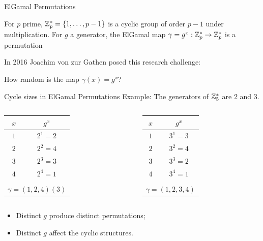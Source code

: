 \begin{frame}{ElGamal Permutations}

For $p$ prime, $\mathbb{Z}_p^* = \{1, \ldots, p-1\}$ is a cyclic group of order $p-1$ under multiplication. For $g$ a generator, the ElGamal map $\gamma = g^x: \mathbb{Z}_p^* \rightarrow \mathbb{Z}_p^*$ is a permutation
\vspace{1cm}

In 2016 Joachim von zur Gathen posed this research challenge:

\begin{center}
  {\Large
How random is the map $\gamma(x) = g^x$?}
\end{center}

\end{frame}




\begin{frame}{Cycle sizes in ElGamal Permutations}
Example: The generators of $\mathbb{Z}_5^*$ are  $2$ and $3$.

    \begin{columns}
        \begin{column}{0.45\textwidth}
        \centering
    	    \begin{tabular}{c|c}
    	        $x$ & $g^{x} $ \\ \hline \hline
    	        $1$ & $2^{1} = 2$ \\
    	        $2$ & $2^{2} = 4$ \\
    	        $3$ & $2^{3} = 3$ \\
              $4$ & $2^{4} = 1$  \\
                \multicolumn{2}{c}{} \\
              \multicolumn{2}{c}{$\gamma = (1,2,4)(3)$}
    	    \end{tabular}
        \end{column}
        \begin{column}{0.45\textwidth}
    	    \centering
    	    \begin{tabular}{c|c}
    	        $x$ & $g^{x} $ \\ \hline \hline
    	        $1$ & $3^{1} = 3$ \\
    	        $2$ & $3^{2} = 4$ \\
    	        $3$ & $3^{3} = 2$ \\
    	        $4$ & $3^{4} = 1$  \\
                \multicolumn{2}{c}{} \\
              \multicolumn{2}{c}{$\gamma  = (1,2,3,4)$}
    	    \end{tabular}
        \end{column}
  \end{columns}
  
  \pause
  \begin{itemize}
      \item Distinct $g$ produce distinct permutations;
      \item Distinct $g$ affect the cyclic structures.
  \end{itemize}
  
\end{frame}

